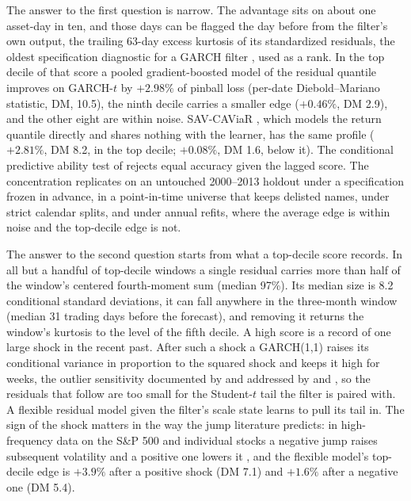\documentclass[11pt]{article}
\theoremstyle{remark}
\begin{document}
The answer to the first question is narrow. The advantage sits on about one asset-day in ten, and those days can be flagged the day before from the filter's own output, the trailing 63-day excess kurtosis of its standardized residuals, the oldest specification diagnostic for a GARCH filter \citep{bollerslev1987, hansen1994ARCD}, used as a rank. In the top decile of that score a pooled gradient-boosted model of the residual quantile improves on GARCH-$t$ by $+2.98\%$ of pinball loss (per-date Diebold--Mariano statistic, DM, 10.5), the ninth decile carries a smaller edge ($+0.46\%$, DM 2.9), and the other eight are within noise. SAV-CAViaR \citep{engle2004caviar}, which models the return quantile directly and shares nothing with the learner, has the same profile ($+2.81\%$, DM 8.2, in the top decile; $+0.08\%$, DM 1.6, below it). The conditional predictive ability test of \citet{giacominiwhite2006} rejects equal accuracy given the lagged score. The concentration replicates on an untouched 2000--2013 holdout under a specification frozen in advance, in a point-in-time universe that keeps delisted names, under strict calendar splits, and under annual refits, where the average edge is within noise and the top-decile edge is not.

The answer to the second question starts from what a top-decile score records. In all but a handful of top-decile windows a single residual carries more than half of the window's centered fourth-moment sum (median 97\%). Its median size is 8.2 conditional standard deviations, it can fall anywhere in the three-month window (median 31 trading days before the forecast), and removing it returns the window's kurtosis to the level of the fifth decile. A high score is a record of one large shock in the recent past. After such a shock a GARCH(1,1) raises its conditional variance in proportion to the squared shock and keeps it high for weeks, the outlier sensitivity documented by \citet{carnero2007outliers} and addressed by \citet{muler2008robust} and \citet{boudt2013robust}, so the residuals that follow are too small for the Student-$t$ tail the filter is paired with. A flexible residual model given the filter's scale state learns to pull its tail in. The sign of the shock matters in the way the jump literature predicts: in high-frequency data on the S\&P 500 and individual stocks a negative jump raises subsequent volatility and a positive one lowers it \citep{pattonsheppard2015}, and the flexible model's top-decile edge is $+3.9\%$ after a positive shock (DM 7.1) and $+1.6\%$ after a negative one (DM 5.4).
\end{document}

